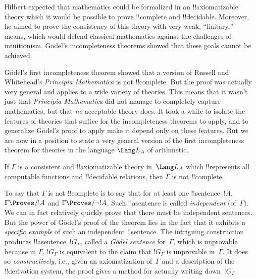 \documentclass[../../../include/open-logic-section]{subfiles}
\begin{document}

Hilbert expected that mathematics could be formalized in an
!!{axiomatizable} theory which it would be possible to prove
!!{complete} and !!{decidable}. Moreover, he aimed to prove the
consistency of this theory with very weak, ``finitary,'' means, which
would defend classical mathematics against the challenges of
intuitionism.  G\"odel's incompleteness theorems showed that these
goals cannot be achieved.

G\"odel's first incompleteness theorem showed that a version of
Russell and Whitehead's \emph{Principia Mathematica} is not
!!{complete}.  But the proof was actually very general and applies to
a wide variety of theories.  This means that it wasn't just that
\emph{Principia Mathematica} did not manage to completely capture
mathematics, but that \emph{no} acceptable theory does.  It took a
while to isolate the features of theories that suffice for the
incompleteness theorems to apply, and to generalize G\"odel's proof to
apply make it depend only on these features.  But we are now in a
position to state a very general version of the first incompleteness
theorem for theories in the language $\Lang L_A$ of arithmetic.

\begin{thm}
If $\Gamma$ is a consistent and !!{axiomatizable} theory in~$\Lang
L_A$ which !!{represents} all computable functions and !!{decidable}
relations, then $\Gamma$ is not !!{complete}.
\end{thm}

To say that $\Gamma$ is not !!{complete} is to say that for at least
one !!{sentence}~$!A$, $\Gamma \Proves/ !A$ and $\Gamma \Proves/ \lnot
!A$.  Such !!a{sentence} is called \emph{independent} (of~$\Gamma)$.
We can in fact relatively quickly prove that there must be independent
sentences. But the power of G\"odel's proof of the theorem lies in the
fact that it exhibits a \emph{specific example} of such an independent
!!{sentence}. The intriguing construction produces
!!a{sentence}~$!G_\Gamma$, called a \emph{G\"odel sentence}
for~$\Gamma$, which is unprovable because in $\Gamma$, $!G_\Gamma$ is
equivalent to the claim that $!G_\Gamma$ is unprovable in~$\Gamma$.  It
does so \emph{constructively}, i.e., given an axiomatization
of~$\Gamma$ and a description of the !!{derivation} system, the proof gives a
method for actually writing down~$!G_\Gamma$.
\end{document}
